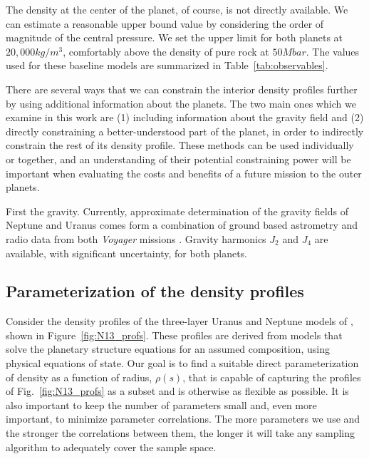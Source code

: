 The density at the center of the planet, of course, is not directly available.
We can estimate a reasonable upper bound value by considering the order of
magnitude of the central pressure. We set the upper limit for both planets at
$20,000\unit{kg/m^3}$, comfortably above the density of pure rock at
${50}\unit{Mbar}$. The values used for these baseline models are summarized in
Table~\ref{tab:observables}.



There are several ways that we can constrain the interior density profiles
further by using additional information about the planets. The two main ones
which we examine in this work are (1) including information about the gravity
field and (2) directly constraining a better-understood part of the planet, in
order to indirectly constrain the rest of its density profile. These methods can
be used individually or together, and an understanding of their potential
constraining power will be important when evaluating the costs and benefits of a
future mission to the outer planets.

First the gravity. Currently, approximate determination of the gravity fields of
Neptune and Uranus comes form a combination of ground based astrometry and radio
data from both \emph{Voyager} missions
\citep[][and references therein]{Jacobson2009,Jacobson2014}. Gravity harmonics
$J_2$ and $J_4$ are available, with significant uncertainty, for both planets.

\subsection{Parameterization of the density profiles}\label{sec:params}

Consider the density profiles of the three-layer Uranus and Neptune models of
\citet{Nettelmann2013b}, shown in Figure~\ref{fig:N13_profs}. These profiles are
derived from models that solve the planetary structure equations for an assumed
composition, using physical equations of state. Our goal is to find a suitable
direct parameterization of density as a function of radius, $\rho(s)$, that is
capable of capturing the profiles of Fig.~\ref{fig:N13_profs} as a subset and is
otherwise as flexible as possible. It is also important to keep the number of
parameters small and, even more important, to minimize parameter correlations.
The more parameters we use and the stronger the correlations between them, the
longer it will take any sampling algorithm to adequately cover the sample space.

